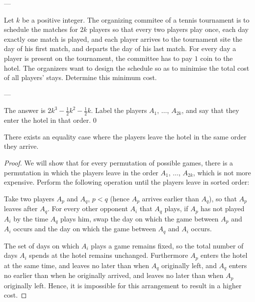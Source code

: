
---

Let $k$ be a positive integer. The organizing commitee of a tennis tournament is to schedule the matches for $2k$ players so that every two players play once, each day exactly one match is played, and each player arrives to the tournament site the day of his first match, and departs the day of his last match. For every day a player is present on the tournament, the committee has to pay $1$ coin to the hotel. The organizers want to design the schedule so as to minimise the total cost of all players' stays. Determine this minimum cost.

---

The answer is $2k^3-\frac12k^2-\frac12k$. Label the players $A_1$, $\ldots$, $A_{2k}$, and say that they enter the hotel in that order.
\setcounter{iclaim}0
\begin{iclaim}
    There exists an equality case where the players leave the hotel in the same order they arrive.
\end{iclaim}
\begin{proof}
    We will show that for every permutation of possible games, there is a permutation in which the players leave in the order $A_1$, $\ldots$, $A_{2k}$, which is not more expensive. Perform the following operation until the players leave in sorted order:

    Take two players $A_p$ and $A_q$, $p<q$ (hence $A_p$ arrives earlier than $A_q$), so that $A_p$ leaves after $A_q$. For every other opponent $A_i$ that $A_q$ plays, if $A_p$ has not played $A_i$ by the time $A_q$ plays him, swap the day on which the game between $A_p$ and $A_i$ occurs and the day on which the game between $A_q$ and $A_i$ occurs.

    The set of days on which $A_i$ plays a game remains fixed, so the total number of days $A_i$ spends at the hotel remains unchanged. Furthermore $A_p$ enters the hotel at the same time, and leaves no later than when $A_q$ originally left, and $A_q$ enters no earlier than when he originally arrived, and leaves no later than when $A_p$ originally left. Hence, it is impossible for this arrangement to result in a higher cost.
\end{proof}

